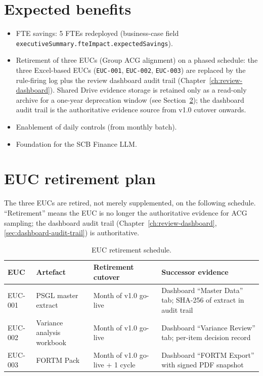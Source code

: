\documentclass[11pt,a4paper,twoside]{report}
\begin{document}
\section{Expected benefits}

\begin{itemize}
\item FTE savings: 5 FTEs redeployed (business-case field
\texttt{executiveSummary.\allowbreak fteImpact.\allowbreak expectedSavings}).
\item Retirement of three EUCs (Group ACG alignment) on a
phased schedule: the three Excel-based EUCs
(\texttt{EUC-001}, \texttt{EUC-002}, \texttt{EUC-003}) are
replaced by the rule-firing log plus the review dashboard
audit trail (Chapter~\ref{ch:review-dashboard}). Shared
Drive evidence storage is retained only as a read-only
archive for a one-year deprecation window
(see Section~\ref{sec:euc-retirement-plan}); the dashboard
audit trail is the authoritative evidence source from
v1.0 cutover onwards.
\item Enablement of daily controls (from monthly batch).
\item Foundation for the SCB Finance LLM.
\end{itemize}

\section{EUC retirement plan}\label{sec:euc-retirement-plan}

The three EUCs are retired, not merely supplemented, on the
following schedule. ``Retirement'' means the EUC is no longer the
authoritative evidence for ACG sampling; the dashboard audit trail
(Chapter~\ref{ch:review-dashboard}, \cref{sec:dashboard-audit-trail}) is authoritative.

\begin{table}[htbp]
\centering
\caption{EUC retirement schedule.}
\label{tab:euc-retirement}
\footnotesize
\begin{tabularx}{\linewidth}{@{}l l l X@{}}
\toprule
\textbf{EUC} & \textbf{Artefact} & \textbf{Retirement cutover} & \textbf{Successor evidence} \\ \midrule
EUC-001 & PSGL master extract & Month of v1.0 go-live & Dashboard ``Master Data'' tab; SHA-256 of extract in audit trail \\
EUC-002 & Variance analysis workbook & Month of v1.0 go-live & Dashboard ``Variance Review'' tab; per-item decision record \\
EUC-003 & FORTM Pack & Month of v1.0 go-live + 1 cycle & Dashboard ``FORTM Export'' with signed PDF snapshot \\
\bottomrule
\end{tabularx}
\end{table}
\end{document}
